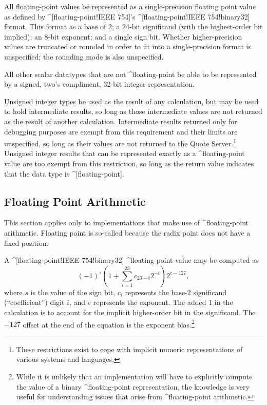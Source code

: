 All floating-point values \shall be represented as a single-precision floating
point value as defined by ^[floating-point!IEEE 754]'s ^[floating-point!IEEE
754!binary32] format. This format as a base of $2$; a 24-bit significand (with
the highest-order bit implied); an 8-bit exponent; and a single sign bit.
Whether higher-precision values are truncated or rounded in order to fit into a
single-precision format is unspecified; the rounding mode is also unspecified.

All other scalar datatypes that are not ^floating-point \shall be able to be
represented by a signed, two's compliment, 32-bit integer representation.

Unsigned integer types \shallnot be used as the result of any calculation, but
may be used to hold intermediate results, so long as those intermediate values
are not returned as the result of another calculation. Intermediate results
returned only for debugging purposes are exempt from this requirement and their
limits are unspecified, so long as their values are not returned to the Quote
Server.\footnote{These restrictions exist to cope with implicit numeric
representations of various systems and languages.} Unsigned integer results that
can be represented exactly as a ^floating-point value are too exempt from this
restriction, so long as the return value indicates that the data type is
^[floating-point].


\subsection{Floating Point Arithmetic}
This section applies only to implementations that make use of ^floating-point
arithmetic. Floating point is so-called because the radix point does not have a
fixed position.

A ^[floating-point!IEEE 754!binary32] ^floating-point value may be computed as
$$
  (-1)^s \left(1+\sum\limits_{i=1}^{23} c_{23-i} 2^{-i}\right)
  2^{e-127},
$$
where $s$ is the value of the sign bit, $c_i$ represents the base-2 significand
(``coefficient'') digit $i$, and $e$ represents the exponent. The added $1$ in
the calculation is to account for the implicit higher-order bit in the
significand. The $-127$ offset at the end of the equation is the exponent
bias.\footnote{While it is unlikely that an implementation will have to
explicitly compute the value of a binary ^floating-point representation, the
knowledge is very useful for understanding issues that arise from
^floating-point arithmetic.}

